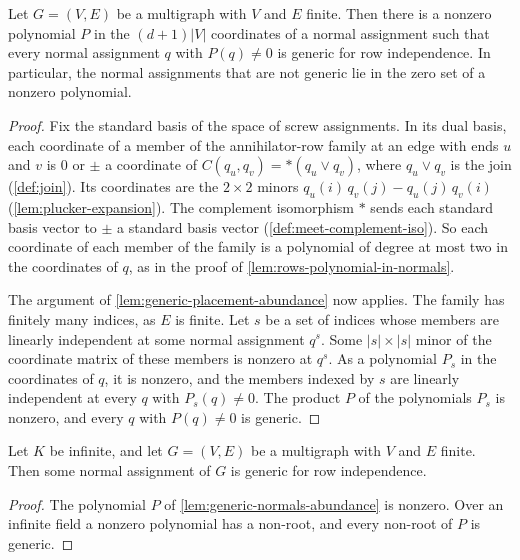 \begin{lemma}
  \label{lem:generic-normals-abundance}
  \leanok
  Let $G = (V, E)$ be a multigraph with $V$ and $E$ finite. Then there
  is a nonzero polynomial $P$ in the $(d+1)|V|$ coordinates of a normal
  assignment such that every normal assignment $q$ with $P(q) \neq 0$
  is generic for row independence. In particular, the normal
  assignments that are not generic lie in the zero set of a nonzero
  polynomial.
\end{lemma}
\begin{proof}
  \leanok
  Fix the standard basis of the space of screw assignments. In its
  dual basis, each coordinate of a member of the
  annihilator-row family at an edge with ends $u$ and $v$ is $0$ or
  $\pm$ a coordinate of $C(q_u, q_v) = *(q_u \vee q_v)$, where
  $q_u \vee q_v$ is the join (\cref{def:join}). Its coordinates are
  the $2 \times 2$ minors $q_u(i)\, q_v(j) - q_u(j)\, q_v(i)$
  (\cref{lem:plucker-expansion}). The complement
  isomorphism $*$ sends each standard basis vector to $\pm$ a standard
  basis vector (\cref{def:meet-complement-iso}). So each coordinate of
  each member of the family is a polynomial of degree at most two in
  the coordinates of $q$, as in the proof of
  \cref{lem:rows-polynomial-in-normals}.

  The argument of \cref{lem:generic-placement-abundance} now applies.
  The family has finitely many indices, as $E$ is finite. Let $s$ be a
  set of indices whose members are linearly independent at some normal
  assignment $q^s$. Some $|s| \times |s|$ minor of the coordinate
  matrix of these members is nonzero at $q^s$. As a polynomial $P_s$ in
  the coordinates of $q$, it is nonzero, and the members indexed by $s$
  are linearly independent at every $q$ with $P_s(q) \neq 0$. The
  product $P$ of the polynomials $P_s$ is nonzero, and every $q$ with
  $P(q) \neq 0$ is generic.
\end{proof}

\begin{lemma}
  \label{lem:exists-generic-normals}
  \leanok
  Let $K$ be infinite, and let $G = (V, E)$ be a multigraph with $V$
  and $E$ finite. Then some normal assignment of $G$ is generic for row
  independence.
\end{lemma}
\begin{proof}
  \leanok
  The polynomial $P$ of \cref{lem:generic-normals-abundance} is
  nonzero. Over an infinite field a nonzero polynomial has a non-root,
  and every non-root of $P$ is generic.
\end{proof}

